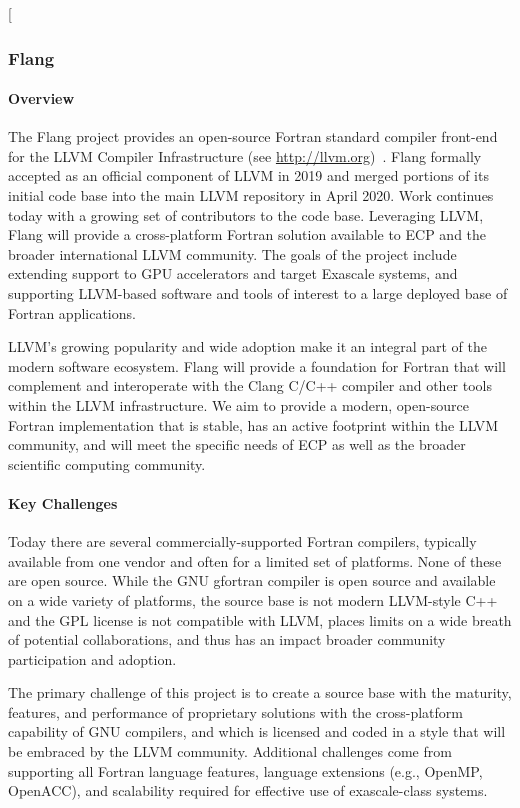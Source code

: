 [\subsubsection{ Flang}\label{subsubsect:flang}

\paragraph{Overview}

The Flang project provides an open-source Fortran standard 
\cite{iso-fortran-2004, iso-fortran-2010, iso-fortran-2018}
compiler front-end for the LLVM Compiler Infrastructure (see
\url{http://llvm.org})~\cite{llvm:homepage}.  Flang formally
accepted as an official component of LLVM in 2019 and merged portions
of its initial code base into the main LLVM repository in April 2020. 
Work continues today with a growing set of contributors to the
code base.  Leveraging LLVM, Flang will provide a
cross-platform Fortran solution available to ECP and the broader
international LLVM community. The goals of the project include
extending support to GPU accelerators and target Exascale systems, and
supporting LLVM-based software and tools of interest to a large
deployed base of Fortran applications.

LLVM's growing popularity and wide adoption make it an integral part
of the modern software ecosystem. Flang will provide a foundation
for Fortran that will complement and interoperate with the
Clang C/C++ compiler and other tools within the LLVM infrastructure.
We aim to provide a modern, open-source Fortran implementation that is
stable, has an active footprint within the LLVM community, and will
meet the specific needs of ECP as well as the broader scientific
computing community.

\paragraph{Key Challenges}
Today there are several commercially-supported Fortran compilers,
typically available from one vendor and often for a limited set of
platforms.  None of these are open source.  While the GNU gfortran compiler is
open source and available on a wide variety of platforms, the source base is not modern
LLVM-style C++ and the GPL license is not compatible with
LLVM, places limits on a wide breath of potential collaborations, and thus has an
impact broader community participation and adoption.

The primary challenge of this project is to create a source base with
the maturity, features, and performance of proprietary solutions with
the cross-platform capability of GNU compilers, and which is licensed
and coded in a style that will be embraced by the LLVM community. 
Additional challenges come from supporting all Fortran
language features, language extensions (e.g., OpenMP, OpenACC), and
scalability required for effective use of exascale-class systems. 

